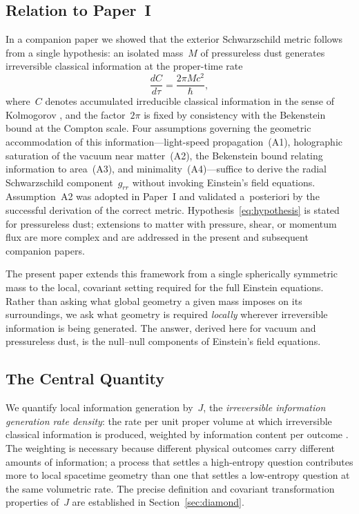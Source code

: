 \documentclass[12pt]{article}
\begin{document}
\subsection{Relation to Paper~I}

In a companion paper \cite{Reilly2026} we showed that the exterior
Schwarzschild metric follows from a single hypothesis: an isolated
mass~$M$ of pressureless dust generates irreversible classical
information at the proper-time rate
\begin{equation}
  \frac{dC}{d\tau} = \frac{2\pi M c^2}{\hbar}, \label{eq:hypothesis}
\end{equation}
where~$C$ denotes accumulated irreducible classical information
in the sense of Kolmogorov \cite{Kolmogorov1965}, and the
factor~$2\pi$ is fixed by consistency with the Bekenstein bound
at the Compton scale.
Four assumptions governing the geometric accommodation of this
information---light-speed propagation~(A1), holographic saturation
of the vacuum near matter~(A2), the Bekenstein bound relating
information to area~(A3), and minimality~(A4)---suffice to derive
the radial Schwarzschild component~$g_{rr}$ without invoking
Einstein's field equations.
Assumption~A2 was adopted in Paper~I and validated a~posteriori
by the successful derivation of the correct metric.
Hypothesis~\eqref{eq:hypothesis} is stated for pressureless dust;
extensions to matter with pressure, shear, or momentum flux
are more complex and are addressed in the present and subsequent
companion papers.

The present paper extends this framework from a single spherically
symmetric mass to the local, covariant setting required for the
full Einstein equations.
Rather than asking what global geometry a given mass imposes on
its surroundings, we ask what geometry is required \emph{locally}
wherever irreversible information is being generated.
The answer, derived here for vacuum and pressureless dust,
is the null--null components of Einstein's field equations.

\subsection{The Central Quantity}

We quantify local information generation by~$J$, the
\emph{irreversible information generation rate density}:
the rate per unit proper volume at which irreversible classical
information is produced, weighted by information content per
outcome \cite{Shannon1948,Kolmogorov1965}.
The weighting is necessary because different physical outcomes
carry different amounts of information; a process that settles
a high-entropy question contributes more to local spacetime
geometry than one that settles a low-entropy question at the
same volumetric rate.
The precise definition and covariant transformation properties
of~$J$ are established in Section~\ref{sec:diamond}.
\end{document}
